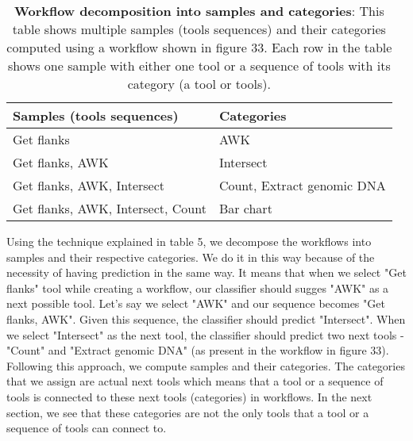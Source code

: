 \begin{table}[ht]
\begin{center}
    \begin{tabular}{|l|l|}
        \hline
        Samples (tools sequences)          & Categories  \\ \hline
        Get flanks                         & AWK         \\ \hline
        Get flanks, AWK                    & Intersect   \\ \hline
        Get flanks, AWK, Intersect         & Count, Extract genomic DNA \\ \hline
        Get flanks, AWK, Intersect, Count  & Bar chart   \\ \hline
    \end{tabular}
    \end{center}
    \caption[Workflow decomposition into samples and categories]{\textbf{Workflow decomposition into samples and categories}: This table shows multiple samples (tools sequences) and their categories computed using a workflow shown in figure 33. Each row in the table shows one sample with either one tool or a sequence of tools with its category (a tool or tools).}
    \label{tab:toolsseqcategory}
\end{table}

Using the technique explained in table 5, we decompose the workflows into samples and their respective categories. We do it in this way because of the necessity of having prediction in the same way. It means that when we select "Get flanks" tool while creating a workflow, our classifier should sugges "AWK" as a next possible tool. Let's say we select "AWK" and our sequence becomes "Get flanks, AWK". Given this sequence, the classifier should predict "Intersect". When we select "Intersect" as the next tool, the classifier should predict two next tools - "Count" and "Extract genomic DNA" (as present in the workflow in figure 33). Following this approach, we compute samples and their categories. The categories that we assign are actual next tools which means that a tool or a sequence of tools is connected to these next tools (categories) in workflows. In the next section, we see that these categories are not the only tools that a tool or a sequence of tools can connect to.

